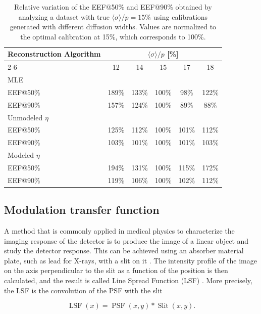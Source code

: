 \begin{table}[!t]
\centering
\begin{tabularx}{\textwidth}{X ccccc}

Reconstruction Algorithm & \multicolumn{5}{c}{$\langle \sigma \rangle / p$ [\%]} \\
\cmidrule(l){2-6}
 & 12 & 14 & 15 & 17 & 18 \\
\midrule
MLE & & & & & \\
\quad EEF@50\% & 189\% & 133\% & 100\% & 98\%  & 122\% \\
\quad EEF@90\% & 157\% & 124\% & 100\% & 89\%  & 88\%  \\
\midrule
Unmodeled $\eta$ & & & & & \\
\quad EEF@50\% & 125\% & 112\% & 100\% & 101\% & 112\% \\
\quad EEF@90\% & 103\% & 101\% & 100\% & 101\% & 103\% \\
\midrule
Modeled $\eta$ & & & & & \\
\quad EEF@50\% & 194\% & 131\% & 100\% & 115\% & 172\% \\
\quad EEF@90\% & 119\% & 106\% & 100\% & 102\% & 112\% \\
\bottomrule
\end{tabularx}
\caption{Relative variation of the EEF@50\% and EEF@90\% obtained by analyzing a dataset with true $\langle \sigma \rangle / p = 15\%$ using calibrations generated with different diffusion widths. Values are normalized to the optimal calibration at 15\%, which corresponds to 100\%.}
\label{tab:variation_eef}
\end{table}

\subsection{Modulation transfer function}
\label{subsec:mtf}

A method that is commonly applied in medical physics to characterize the imaging response of the detector is to produce the image of a linear object and study the detector response. This can be achieved using an absorber material plate, such as lead for X-rays, with a slit on it \cite{fujita1992}. The intensity profile of the image on the axis perpendicular to the slit as a function of the position is then calculated, and the result is called Line Spread Function (LSF) \cite{med_imaging}. More precisely, the LSF is the convolution of the PSF with the slit

\begin{equation}
\operatorname{LSF}(x) = \operatorname{PSF}(x, y) \ast \operatorname{Slit}(x, y).
\end{equation}

